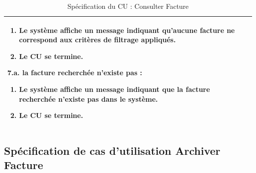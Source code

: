 \begin{table}[H]
\begin{tabularx}{\textwidth}{|p{3.4cm}|X|}
\begin{enumerate}[leftmargin=1.5em, topsep=1pt, itemsep=0pt]
  \item Le système affiche un message indiquant qu'aucune facture ne correspond aux critères de filtrage appliqués.
  \item Le CU se termine.
\end{enumerate}
\textbf{7.a. la facture recherchée n'existe pas :}
\begin{enumerate}[leftmargin=1.5em, topsep=1pt, itemsep=0pt]
  \item Le système affiche un message indiquant que la facture recherchée n'existe pas dans le système.
  \item Le CU se termine.
\end{enumerate} \\
\hline
\end{tabularx}
\caption{Spécification du CU : Consulter Facture}
\label{tab:cu-consulter-facture}
\end{table}
\subsection{Spécification de cas d'utilisation Archiver Facture}

